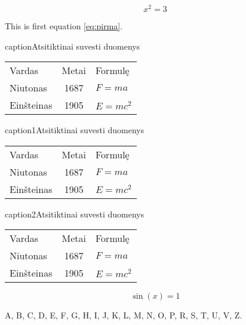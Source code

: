 \documentclass[12pt, a4paper, onecolumn, titlepage, oneside, intlimits]{report}
\begin{document}
 





% 
\ktuinit{}    

\begin{equation}\label{eq:pirma}
x^2=3
\end{equation} 

This is first equation \ref{eq:pirma}.


\begin{ktutable}{caption}{Atsitiktinai suvesti duomenys}
    \begin{tabular}{lcl}
      Vardas & Metai & Formulę \\
      Niutonas   & 1687 & $F = m a$ \\
      Einšteinas & 1905 & $E = m c^2$ \\
    \end{tabular}
\end{ktutable}

\begin{ktutable}{caption1}{Atsitiktinai suvesti duomenys}
    \begin{tabular}{lcl}
      Vardas & Metai & Formulę \\
      Niutonas   & 1687 & $F = m a$ \\
      Einšteinas & 1905 & $E = m c^2$ \\
    \end{tabular}
\end{ktutable}

\begin{ktutable}{caption2}{Atsitiktinai suvesti duomenys}
    \begin{tabular}{lcl}
      Vardas & Metai & Formulę \\
      Niutonas   & 1687 & $F = m a$ \\
      Einšteinas & 1905 & $E = m c^2$ \\
    \end{tabular}
\end{ktutable}
\newpage



\newpage

\begin{equation}
\sin(x)=1 
\end{equation}

% 

\ktuliterature{}

\clearpage
\begin{ktuappendices}

A, B, C, D, E, F, G, H, I, J, K, L, M, N, O, P, R, S, T, U, V, Z.

\end{ktuappendices}
\end{document}
